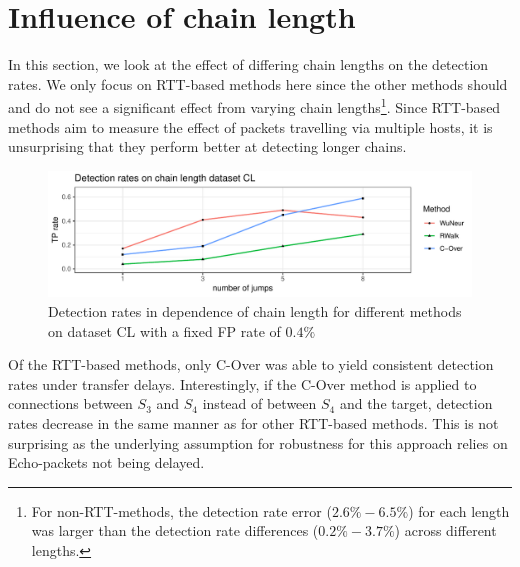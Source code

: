 \documentclass[runningheads,11pt]{llncs}\usepackage[]{graphicx}\usepackage[]{color}
\makeatletter
\def\maxwidth{ %
  \ifdim\Gin@nat@width>\linewidth
    \linewidth
  \else
    \Gin@nat@width
  \fi
}
\newenvironment{knitrout}{}{} %
\makeatother
\begin{document}


\section{Influence of chain length}\label{Sec:Chainl}

In this section, we look at the effect of differing chain lengths on the detection rates. We only focus on RTT-based methods here since the other methods should and do not see a significant effect from varying chain lengths\footnote{For non-RTT-methods, the detection rate error ($2.6\%-6.5\%$) for each length was larger than the detection rate differences ($0.2\%-3.7\%$) across different lengths.}. Since RTT-based methods aim to measure the effect of packets travelling via multiple hosts, it is unsurprising that they perform better at detecting longer chains. 

\begin{knitrout}
\color{fgcolor}\begin{figure}
\includegraphics[width=\maxwidth]{figure/Influencechainl-1} \caption[Detection rates in dependence of chain length for different methods on dataset CL with a fixed FP rate of $0.4\%$]{Detection rates in dependence of chain length for different methods on dataset CL with a fixed FP rate of $0.4\%$}\label{fig:Influencechainl}
\end{figure}


\end{knitrout}


Of the RTT-based methods, only C-Over was able to yield consistent detection rates under transfer delays. 
Interestingly, if the C-Over method is applied to connections between $S_3$ and $S_4$ instead of between $S_4$ and the target, detection rates decrease in the same manner as for other RTT-based methods. This is not surprising as the underlying assumption for robustness for this approach relies on Echo-packets not being delayed.
\end{document}
